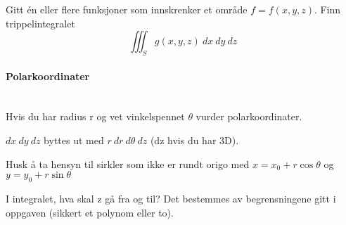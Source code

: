 Gitt én eller flere funksjoner som innskrenker et område $f = f(x,y,z)$.
Finn trippelintegralet
$$\iiint_S g(x,y,z) \: dx \: dy \: dz$$



\paragraph{Polarkoordinater} \mbox{} \\
Hvis du har radius r og vet vinkelspennet $\theta$ vurder polarkoordinater.

$dx \: dy \: dz$ byttes ut med $r \: dr \: d\theta \: dz$ (dz hvis du har 3D).

Husk å ta hensyn til sirkler som ikke er rundt origo med
$x = x_0 + r\cos \theta$ og $y = y_0 + r\sin \theta$

I integralet, hva skal z gå fra og til?
Det bestemmes av begrensningene gitt i oppgaven (sikkert et polynom eller to).
